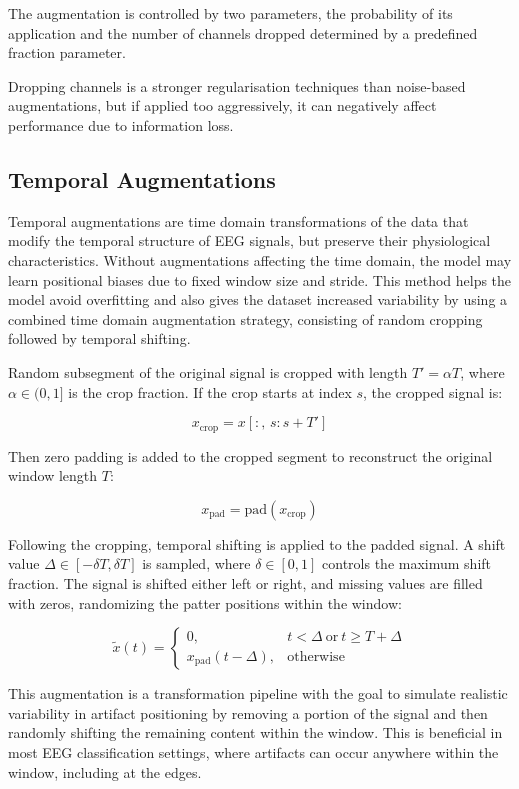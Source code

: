 The augmentation is controlled by two parameters, the probability of its application and the number of channels dropped determined by a predefined fraction parameter. 

Dropping channels is a stronger regularisation techniques than noise-based augmentations, but if applied too aggressively, it can negatively affect performance due to
information loss.

\subsection{Temporal Augmentations}

Temporal augmentations are time domain transformations of the data that modify the temporal structure of EEG signals, but preserve their physiological characteristics. Without augmentations affecting the time domain, the model may learn positional biases due to fixed window size and stride. This method helps the model avoid overfitting and also gives the dataset increased variability by using a combined time domain augmentation strategy, consisting of random cropping followed by temporal shifting.

Random subsegment of the original signal is cropped with length $T' = \alpha T$, where $\alpha \in (0, 1]$ is the crop fraction. If the crop starts at index $s$, the cropped signal is:

\[
x_{\text{crop}} = x[:,\, s : s + T']
\]

Then zero padding is added to the cropped segment to reconstruct the original window length $T$:

\[
x_{\text{pad}} = \text{pad}(x_{\text{crop}})
\]

Following the cropping, temporal shifting is applied to the padded signal. A shift value $\Delta \in [-\delta T, \delta T]$ is sampled, where $\delta \in [0,1]$ controls the maximum shift fraction. The signal is shifted either left or right, and missing values are filled with zeros, randomizing the patter positions within the window: 

\[
\tilde{x}(t) =
\begin{cases}
0, & t < \Delta \ \text{or} \ t \geq T + \Delta \\
x_{\text{pad}}(t - \Delta), & \text{otherwise}
\end{cases}
\]

This augmentation is a transformation pipeline with the goal to simulate realistic variability in artifact positioning by removing a portion of the signal and then randomly shifting the remaining content within the window. This is beneficial in most EEG classification settings, where artifacts can occur anywhere within the window, including at the edges.

